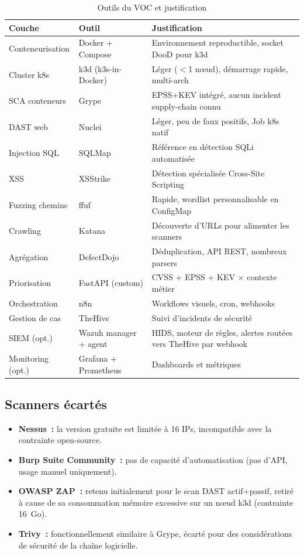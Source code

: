 \documentclass[12pt,a4paper]{report}
\begin{document}
\begin{table}[H]
\centering
\caption{Outils du VOC et justification}
\small
\begin{tabularx}{\textwidth}{L{2.8cm} L{2.8cm} X}
\toprule
\textbf{Couche} & \textbf{Outil} & \textbf{Justification} \\
\midrule
Conteneurisation & Docker + Compose    & Environnement reproductible, socket DooD pour k3d \\
Cluster k8s      & k3d (k3s-in-Docker) & Léger ($<$1 nœud), démarrage rapide, multi-arch \\
SCA conteneurs   & Grype               & EPSS+KEV intégré, aucun incident supply-chain connu \\
DAST web         & Nuclei              & Léger, peu de faux positifs, Job k8s natif \\
Injection SQL    & SQLMap              & Référence en détection SQLi automatisée \\
XSS              & XSStrike            & Détection spécialisée Cross-Site Scripting \\
Fuzzing chemins  & ffuf                & Rapide, wordlist personnalisable en ConfigMap \\
Crawling         & Katana              & Découverte d'URLs pour alimenter les scanners \\
Agrégation       & DefectDojo          & Déduplication, API REST, nombreux parsers \\
Priorisation     & FastAPI (custom)    & CVSS + EPSS + KEV $\times$ contexte métier \\
Orchestration    & n8n                 & Workflows visuels, cron, webhooks \\
Gestion de cas   & TheHive             & Suivi d'incidents de sécurité \\
SIEM (opt.)      & Wazuh manager + agent & HIDS, moteur de règles, alertes routées vers TheHive par webhook \\
Monitoring (opt.)& Grafana + Prometheus & Dashboards et métriques \\
\bottomrule
\end{tabularx}
\end{table}

\subsection{Scanners écartés}
\begin{itemize}[nosep]
    \item \textbf{Nessus~:} la version gratuite est limitée à 16 IPs, incompatible avec la contrainte open-source.
    \item \textbf{Burp Suite Community~:} pas de capacité d'automatisation (pas d'API, usage manuel uniquement).
    \item \textbf{OWASP ZAP~:} retenu initialement pour le scan DAST actif+passif, retiré à cause de sa consommation mémoire excessive sur un nœud k3d (contrainte 16~Go).
    \item \textbf{Trivy~:} fonctionnellement similaire à Grype, écarté pour des considérations de sécurité de la chaîne logicielle.
\end{itemize}
\end{document}
